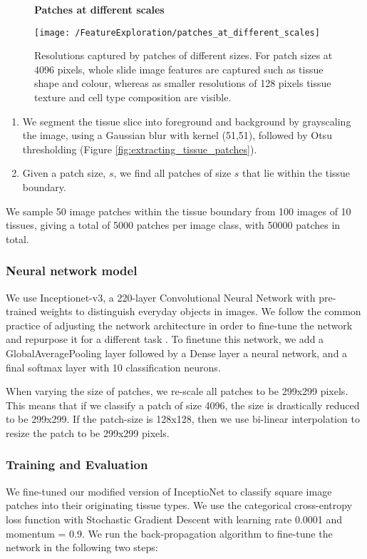 \documentclass[graybox]{svmult}
\newcommand*{\figuretitle}[1]{%
    {\centering%
    \textbf{#1}%
    \par\medskip}%
}
\begin{document}
\begin{figure}[H]
\figuretitle{Patches at different scales}
    \centering
    \texttt{[image: /FeatureExploration/patches\_at\_different\_scales]}
    \caption{Resolutions captured by patches of different sizes. For patch sizes at 4096 pixels, whole slide image features are captured such as tissue shape and colour, whereas as smaller resolutions of 128 pixels tissue texture and cell type composition are visible.}
    \label{patches-different-scales}
\end{figure}


\begin{enumerate}
\item We segment the tissue slice into foreground and background by grayscaling the image, using a Gaussian blur \cite{shapiro-computer-vision} with kernel (51,51), followed by Otsu thresholding \cite{otsu-method} (Figure \ref{fig:extracting_tissue_patches}).
\item Given a patch size, $s$, we find all patches of size $s$ that lie within the tissue boundary. 
\end{enumerate}

We sample 50 image patches within the tissue boundary from 100 images of 10 tissues, giving a total of 5000 patches per image class, with 50000 patches in total. 

\subsubsection{Neural network model}
We use Inceptionet-v3, a 220-layer Convolutional Neural Network with pre-trained weights to distinguish everyday objects in images. We follow the common practice of adjusting the network architecture in order to fine-tune the network and repurpose it for a different task \cite{fine-tuning-deep-convolutional-neural-networks}. To finetune this network, we add a GlobalAveragePooling layer \cite{network-in-network} followed by a Dense layer a neural network, and a final softmax layer with 10 classification neurons.

When varying the size of patches, we re-scale all patches to be 299x299 pixels. This means that if we classify a patch of size 4096, the size is drastically reduced to be 299x299. If the patch-size is 128x128, then we use bi-linear interpolation to resize the patch to be 299x299 pixels. 

\subsubsection{Training and Evaluation}
We fine-tuned our modified version of InceptioNet to classify square image patches into their originating tissue types. We use the categorical cross-entropy loss function with Stochastic Gradient Descent with learning rate 0.0001 and momentum = 0.9. We run the back-propagation algorithm to fine-tune the network in the following two steps:
\end{document}

